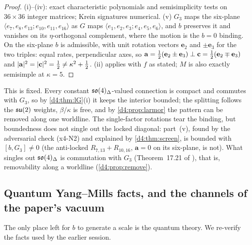 \begin{proof}
(i)--(iv): exact characteristic polynomials and semisimplicity tests on $36\times36$ integer matrices; Krein signatures numerical. (v) $G_3$ maps
the six-plane $\langle e_7,e_8,e_{13};e_{10},e_{11},e_{16}\rangle$ as $G$ maps $\langle e_1,e_2,e_3;e_4,e_5,e_6\rangle$, and $b$ preserves it and vanishes on its
$\eta$-orthogonal complement, where the motion is the $b=0$ binding. On the six-plane $b$ is admissible, with unit rotation vectors $\mathbf e_2$ and
$\pm\mathbf e_3$ for the two triples: equal rates, perpendicular axes, so $\mathbf a=\tfrac12(\mathbf e_2\pm\mathbf e_3)\perp\mathbf c=\tfrac12(\mathbf e_2\mp\mathbf e_3)$ and
$|\mathbf a|^2=|\mathbf c|^2=\tfrac12\neq\kappa^2+\tfrac12$. (ii) applies with $f$ as stated; $M$ is also exactly semisimple at $\kappa=5$.
\end{proof}

This is fixed. Every constant $\mathfrak{so}(4)_\Delta$-valued connection is compact and commutes with $G_3$, so by \cref{d4:thm:lG}(i) it keeps the interior
bounded; the splitting follows the $\mathfrak{su}(2)$ weights, $\beta/\kappa$ is free, and by \cref{d4:prop:larmor} the pattern can be removed along one
worldline. The single-factor rotations tear the binding, but boundedness does not single out the locked diagonal: part~(v), found by the
adversarial check (x4-N2) and explained by \cref{d4:thm:screen}, is bounded with $[b,G_3]\neq0$ (the anti-locked $R_{7,13}+R_{10,16}$, $\mathbf a=0$ on its
six-plane, is not). What singles out $\mathfrak{so}(4)_\Delta$ is commutation with $G_3$ (Theorem~17.21 of \cite{ES17}), that is, removability along a worldline
(\cref{d4:prop:remove}).

\subsection{Quantum Yang--Mills facts, and the channels of the paper's vacuum}
\label{d4:sec:qym}

The only place left for $b$ to generate a scale is the quantum theory. We re-verify the facts used by the earlier session.

